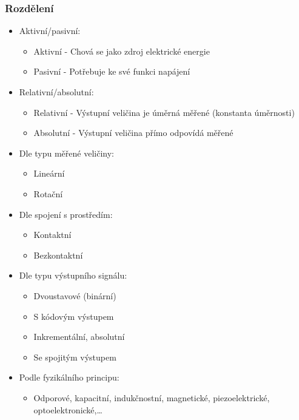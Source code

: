 \subsubsection*{Rozdělení}
\begin{itemize}
    \item Aktivní/pasivní:\begin{itemize}
              \item Aktivní - Chová se jako zdroj elektrické energie
              \item Pasivní - Potřebuje ke své funkci napájení
          \end{itemize}
    \item Relativní/absolutní: \begin{itemize}
              \item Relativní - Výstupní veličina je úměrná měřené (konstanta úměrnosti)
              \item Absolutní - Výstupní veličina přímo odpovídá měřené
          \end{itemize}
    \item Dle typu měřené veličiny: \begin{itemize}
              \item Lineární
              \item Rotační
          \end{itemize}
    \item Dle spojení s prostředím: \begin{itemize}
              \item Kontaktní
              \item Bezkontaktní
          \end{itemize}
    \item Dle typu výstupního signálu: \begin{itemize}
              \item Dvoustavové (binární)
              \item S kódovým výstupem
              \item Inkrementální, absolutní
              \item Se spojitým výstupem
          \end{itemize}
    \item Podle fyzikálního principu: \begin{itemize}
              \item Odporové, kapacitní, indukčnostní, magnetické, piezoelektrické, optoelektronické,\dots
          \end{itemize}

\end{itemize}
